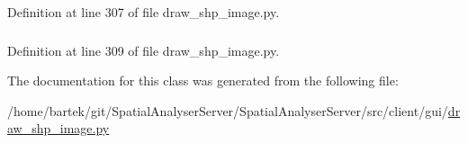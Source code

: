 Definition at line 307 of file draw\_\-shp\_\-image.py.

\hypertarget{classsrc_1_1client_1_1gui_1_1draw__shp__image_1_1Ui__DrawSHPImage_ac28bab29b487e5025e70ab68ac647405}{
\subsubsection[{y}]{}}
\label{classsrc_1_1client_1_1gui_1_1draw__shp__image_1_1Ui__DrawSHPImage_ac28bab29b487e5025e70ab68ac647405}


Definition at line 309 of file draw\_\-shp\_\-image.py.



The documentation for this class was generated from the following file:\begin{DoxyCompactItemize}
\item 
/home/bartek/git/SpatialAnalyserServer/SpatialAnalyserServer/src/client/gui/\hyperlink{draw__shp__image_8py}{draw\_\-shp\_\-image.py}\end{DoxyCompactItemize}
